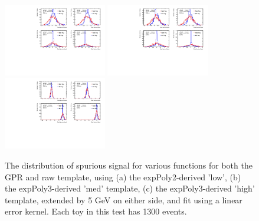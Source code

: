 \begin{figure} 
\begin{center}
  \includegraphics[width=0.4\textwidth]{figures/background/gpr/validation/linear/ToyTest_FitSigVals_lowpT_1300_noSig}   
  \includegraphics[width=0.4\textwidth]{figures/background/gpr/validation/linear/ToyTest_FitSigVals_medpT_1300_noSig}   
  \includegraphics[width=0.4\textwidth]{figures/background/gpr/validation/linear/ToyTest_FitSigVals_highpT_1300_noSig}   
\caption{The distribution of spurious signal for various functions for both the GPR and raw template, using (a) the expPoly2-derived 'low', (b) the expPoly3-derived 'med' template, (c) the expPoly3-derived 'high' template, extended by 5 GeV on either side, and fit using a linear error kernel. Each toy in this test has 1300 events.}
\label{fig:linearkernel_lowpt_1300_noSig}
\end{center}
\end{figure}

